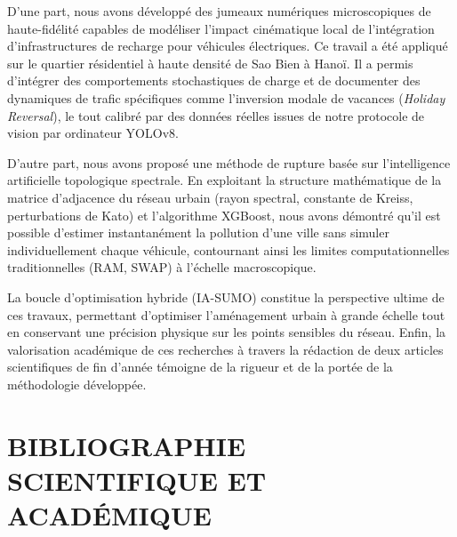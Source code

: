 \documentclass[10pt, a4paper]{article}
\begin{document}
D'une part, nous avons développé des jumeaux numériques microscopiques
de haute-fidélité capables de modéliser l'impact cinématique local de
l'intégration d'infrastructures de recharge pour véhicules électriques.
Ce travail a été appliqué sur le quartier résidentiel à haute densité de
Sao Bien à Hanoï. Il a permis d'intégrer des comportements stochastiques
de charge et de documenter des dynamiques de trafic spécifiques comme
l'inversion modale de vacances (\emph{Holiday Reversal}), le tout
calibré par des données réelles issues de notre protocole de vision par
ordinateur YOLOv8.

D'autre part, nous avons proposé une méthode de rupture basée sur
l'intelligence artificielle topologique spectrale. En exploitant la
structure mathématique de la matrice d'adjacence du réseau urbain (rayon
spectral, constante de Kreiss, perturbations de Kato) et l'algorithme
XGBoost, nous avons démontré qu'il est possible d'estimer instantanément
la pollution d'une ville sans simuler individuellement chaque véhicule,
contournant ainsi les limites computationnelles traditionnelles (RAM,
SWAP) à l'échelle macroscopique.

La boucle d'optimisation hybride (IA-SUMO) constitue la perspective
ultime de ces travaux, permettant d'optimiser l'aménagement urbain à
grande échelle tout en conservant une précision physique sur les points
sensibles du réseau. Enfin, la valorisation académique de ces recherches
à travers la rédaction de deux articles scientifiques de fin d'année
témoigne de la rigueur et de la portée de la méthodologie développée.

\newpage

\section{BIBLIOGRAPHIE SCIENTIFIQUE ET
ACADÉMIQUE}\label{bibliographie-scientifique-et-acaduxe9mique}
\end{document}
